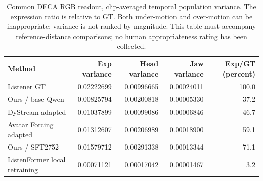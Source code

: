 \begin{table}[H]
\centering\small
\caption{Common DECA RGB readout, clip-averaged temporal population variance. The expression ratio is relative to GT. Both under-motion and over-motion can be inappropriate; variance is not ranked by magnitude. This table must accompany reference-distance comparisons; no human appropriateness rating has been collected.}
\label{tab:rgb-motion-amplitude}
\setlength{\tabcolsep}{4pt}
\begin{tabular}{lrrrr}
\toprule
Method & Exp variance & Head variance & Jaw variance & Exp/GT (percent) \\
\midrule
Listener GT & 0.02222699 & 0.00996665 & 0.00024011 & 100.0 \\
Ours / base Qwen & 0.00825794 & 0.00200818 & 0.00005330 & 37.2 \\
DyStream adapted & 0.01037899 & 0.00099086 & 0.00006846 & 46.7 \\
Avatar Forcing adapted & 0.01312607 & 0.00206989 & 0.00018900 & 59.1 \\
Ours / SFT2752 & 0.01579712 & 0.00291338 & 0.00013344 & 71.1 \\
ListenFormer local retraining & 0.00071121 & 0.00017042 & 0.00001467 & 3.2 \\
\bottomrule
\end{tabular}
\end{table}
